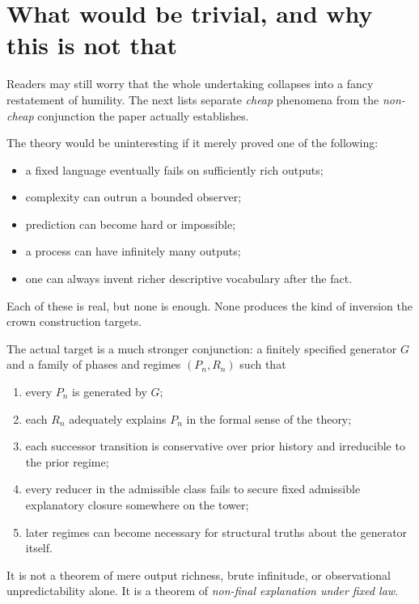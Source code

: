 \documentclass[11pt,a4paper]{article}
\theoremstyle{definition}
\begin{document}
\section{What would be trivial, and why this is not that}\label{sec:nottrivial}

\noindent
Readers may still worry that the whole undertaking collapses into a fancy restatement of humility. The next lists separate \emph{cheap} phenomena from the \emph{non-cheap} conjunction the paper actually establishes.

The theory would be uninteresting if it merely proved one of the following:

\begin{itemize}[leftmargin=2em]
\item a fixed language eventually fails on sufficiently rich outputs;
\item complexity can outrun a bounded observer;
\item prediction can become hard or impossible;
\item a process can have infinitely many outputs;
\item one can always invent richer descriptive vocabulary after the fact.
\end{itemize}

Each of these is real, but none is enough. None produces the kind of inversion the crown construction targets.

The actual target is a much stronger conjunction: a finitely specified generator $G$ and a family of phases and regimes $(P_n,R_n)$ such that

\begin{enumerate}[leftmargin=2em]
\item every $P_n$ is generated by $G$;
\item each $R_n$ adequately explains $P_n$ in the formal sense of the theory;
\item each successor transition is conservative over prior history and irreducible to the prior regime;
\item every reducer in the admissible class fails to secure fixed admissible explanatory closure somewhere on the tower;
\item later regimes can become necessary for structural truths about the generator itself.
\end{enumerate}

It is not a theorem of mere output richness, brute infinitude, or observational unpredictability alone. It is a theorem of \emph{non-final explanation under fixed law}.
\end{document}
